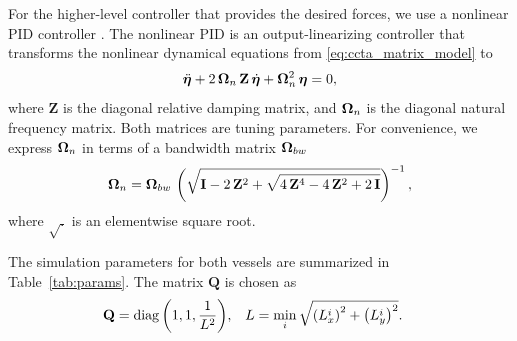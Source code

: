 For the higher-level controller that provides the desired forces, we use a nonlinear PID controller \cite{fossen_handbook_2011}.
The nonlinear PID is an output-linearizing controller that transforms the nonlinear dynamical equations from \eqref{eq:ccta_matrix_model} to
\begin{equation}
    \ddot{\bm{\eta}} + 2\,\bm{\Omega}_n\,\mathbf{Z}\,\dot{\bm{\eta}} + \bm{\Omega}_n^2\,\bm{\eta} = 0,
\end{equation}
where $\mathbf{Z}$ is the diagonal relative damping matrix, and $\bm{\Omega}_n$ is the diagonal natural frequency matrix.
Both matrices are tuning parameters.
For convenience, we express $\bm{\Omega}_n$ in terms of a bandwidth matrix $\bm{\Omega}_{bw}$
\begin{equation}
    \bm{\Omega}_n = \bm{\Omega}_{bw} \, \left(\sqrt{\mathbf{I} - 2\,\mathbf{Z}^2 + \sqrt{4\,\mathbf{Z}^4 - 4\,\mathbf{Z}^2 + 2\,\mathbf{I}}}\right)^{-1},
\end{equation}
where $\sqrt{.}$ is an elementwise square root.

The simulation parameters for both vessels are summarized in Table~\ref{tab:params}.
The matrix $\mathbf{Q}$ is chosen as
\begin{align}
    \mathbf{Q} &= \operatorname*{diag}{\left( 1,1,\frac{1}{L^2} \right)},&
    L &= \min_{i} \sqrt{\left(L_x^i\right)^2 + \left(L_y^i\right)^2}.
\end{align}

